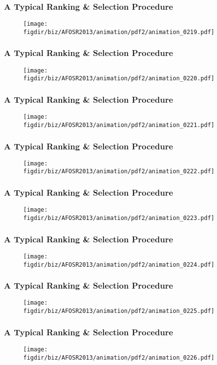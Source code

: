 \documentclass[13pt]{beamer}
\newcommand{\figdir}{../../fig}
\begin{document}
\begin{frame}\frametitle{A Typical Ranking \& Selection Procedure}\begin{figure}\texttt{[image: \\figdir/biz/AFOSR2013/animation/pdf2/animation\_0219.pdf]}\end{figure}\end{frame}
\begin{frame}\frametitle{A Typical Ranking \& Selection Procedure}\begin{figure}\texttt{[image: \\figdir/biz/AFOSR2013/animation/pdf2/animation\_0220.pdf]}\end{figure}\end{frame}
\begin{frame}\frametitle{A Typical Ranking \& Selection Procedure}\begin{figure}\texttt{[image: \\figdir/biz/AFOSR2013/animation/pdf2/animation\_0221.pdf]}\end{figure}\end{frame}
\begin{frame}\frametitle{A Typical Ranking \& Selection Procedure}\begin{figure}\texttt{[image: \\figdir/biz/AFOSR2013/animation/pdf2/animation\_0222.pdf]}\end{figure}\end{frame}
\begin{frame}\frametitle{A Typical Ranking \& Selection Procedure}\begin{figure}\texttt{[image: \\figdir/biz/AFOSR2013/animation/pdf2/animation\_0223.pdf]}\end{figure}\end{frame}
\begin{frame}\frametitle{A Typical Ranking \& Selection Procedure}\begin{figure}\texttt{[image: \\figdir/biz/AFOSR2013/animation/pdf2/animation\_0224.pdf]}\end{figure}\end{frame}
\begin{frame}\frametitle{A Typical Ranking \& Selection Procedure}\begin{figure}\texttt{[image: \\figdir/biz/AFOSR2013/animation/pdf2/animation\_0225.pdf]}\end{figure}\end{frame}
\begin{frame}\frametitle{A Typical Ranking \& Selection Procedure}\begin{figure}\texttt{[image: \\figdir/biz/AFOSR2013/animation/pdf2/animation\_0226.pdf]}\end{figure}\end{frame}
\end{document}
